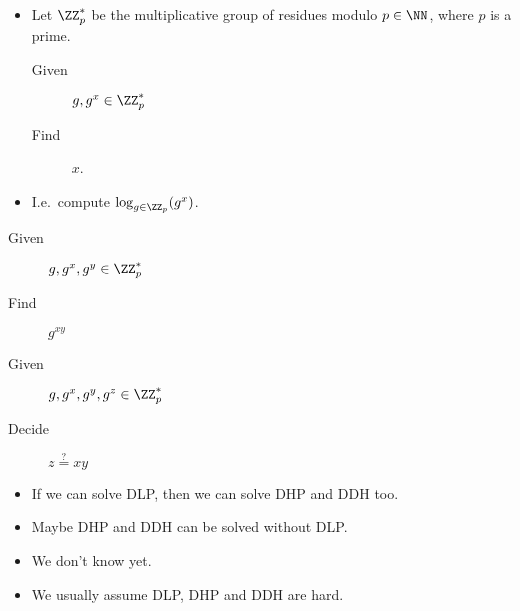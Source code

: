 \begin{frame}
  \begin{definition}
    \begin{itemize}
      \item Let \(\ZZ_p^*\) be the multiplicative group of residues modulo 
        \(p\in \NN\), where \(p\) is a prime.

        \pause{}

        \begin{description}
          \item[Given] \(g, g^x\in \ZZ_p^*\)
          \item[Find] \(x\).
        \end{description}

      \item I.e.\ compute \(\log_{g\in \ZZ_p}(g^x)\).
    \end{itemize}
  \end{definition}
\end{frame}

\begin{frame}
  \begin{definition}
    \begin{description}
      \item[Given] \(g, g^x, g^y\in \ZZ_p^*\)
      \item[Find] \(g^{xy}\)
    \end{description}
  \end{definition}

  \pause{}
  
  \begin{definition}
    \begin{description}
      \item[Given] \(g, g^x, g^y, g^z\in \ZZ_p^*\)
      \item[Decide] \(z \stackrel{?}{=} xy\)
    \end{description}
  \end{definition}
\end{frame}

\begin{frame}
  \begin{itemize}
    \item If we can solve \ac{DLP}, then we can solve \ac{DHP} and \ac{DDH} 
      too.

      \pause{}

    \item Maybe \ac{DHP} and \ac{DDH} can be solved without \ac{DLP}.
    \item We don't know yet.

      \pause{}

    \item We usually assume \ac{DLP}, \ac{DHP} and \ac{DDH} are hard.
  \end{itemize}
\end{frame}

